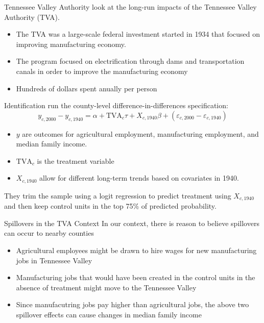 \documentclass[aspectratio=43]{beamer}
\begin{document}
\begin{frame}{Tennessee Valley Authority}
    \citet{Kline_Moretti_2014} look at the long-run impacts of the Tennessee Valley Authority (TVA).

    \begin{itemize}
        \item The TVA was a large-scale federal investment started in 1934 that focused on improving manufacturing economy.
        
        \item The program focused on electrification through dams and transportation canals in order to improve the manufacturing economy
        
        \item Hundreds of dollars spent anually per person
    \end{itemize}
\end{frame}

\begin{frame}{Identification}
    \citet{Kline_Moretti_2014} run the county-level difference-in-differences  specification: 
    \begin{equation}\label{eq:tva_spillover}
        y_{c, 2000} - y_{c, 1940} = \alpha + \text{TVA}_c \tau + X_{c, 1940} \beta + (\varepsilon_{c, 2000} - \varepsilon_{c, 1940})
    \end{equation} 

    \begin{itemize}
        \item $y$ are outcomes for agricultural employment, manufacturing employment, and median family income.
        \item $\text{TVA}_c$ is the treatment variable
        \item $X_{c, 1940}$ allow for different long-term trends based on covariates in 1940. 
    \end{itemize}

    They trim the sample using a logit regression to predict treatment using $X_{c,1940}$ and then keep control units in the top 75\% of predicted probability.
\end{frame}

\begin{frame}{Spillovers in the TVA Context}
    In our context, there is reason to believe spillovers can occur to nearby counties

    \begin{itemize}
        \item Agricultural employees might be drawn to hire wages for new manufacturing jobs in Tennessee Valley 
        
        \item Manufacturing jobs that would have been created in the control units in the absence of treatment might move to the Tennessee Valley
        
        \item Since manufacutring jobs pay higher than agricultural jobs, the above two spillover effects can cause changes in median family income
    \end{itemize}
\end{frame}
\end{document}
